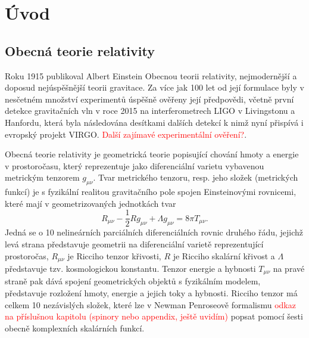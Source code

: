 \chapter*{Úvod}

\section*{Obecná teorie relativity}

Roku 1915 publikoval Albert Einstein Obecnou teorii relativity, nejmodernější a doposud nejúspěšnější teorii gravitace. Za více jak 100 let od její formulace byly v nesčetném množství
experimentů úspěšně ověřeny její předpovědi, včetně první detekce gravitačních vln v roce 2015 na interferometrech LIGO v Livingstonu a Hanfordu, která byla následována
desítkami dalších detekcí k nimž nyní přispívá i evropský projekt VIRGO. \textcolor{red}{Další zajímavé experimentální ověření?}.



Obecná teorie relativity je geometrická teorie popisující chování hmoty a energie v prostoročasu, který reprezentuje jako diferenciální varietu vybavenou metrickým tenzorem $g_{\mu \nu}$.
Tvar metrického tenzoru, resp. jeho složek (metrických funkcí) je s fyzikální realitou gravitačního pole spojen Einsteinovými rovnicemi, které mají v geometrizovaných jednotkách
tvar
\begin{equation}
    \label{eq:einsten_field_equations}
    R_{\mu \nu} - \frac{1}{2} R g_{\mu \nu} + \Lambda g_{\mu \nu} = 8 \pi T_{\mu \nu}.
\end{equation}
Jedná se o 10 nelineárních parciálních diferenciálních rovnic druhého řádu, jejichž levá strana představuje geometrii na diferenciální varietě reprezentující prostoročas, $R_{\mu \nu}$ je Ricciho tenzor křivosti, $R$ je Ricciho skalární křivost a $\Lambda$
představuje tzv. kosmologickou konstantu. Tenzor energie a hybnosti $T_{\mu \nu}$ na pravé straně pak dává spojení geometrických objektů s fyzikálním modelem, představuje rozložení hmoty,
energie a jejich toky a hybnosti.
Ricciho tenzor má celkem 10 nezávislých složek, které lze v Newman Penroseově formalismu \textcolor{red}{odkaz na příslušnou kapitolu (spinory nebo appendix, ještě uvidím)} popsat pomocí šesti obecně komplexních skalárních funkcí.